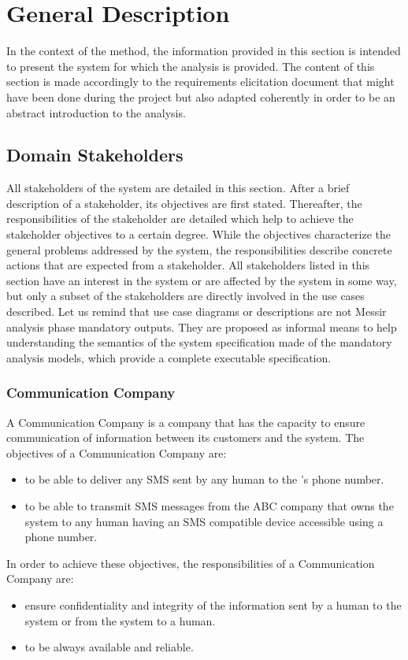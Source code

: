 
\chapter{General Description}
In the context of the \msrmessir method, the information provided in this
section is intended to present the system for which the \msrmessir analysis is
provided. The content of this section is made accordingly to the requirements
elicitation document that might have been done during the project but also
adapted coherently in order to be an abstract introduction to the \msrmessir
analysis.

\section{Domain Stakeholders}
All stakeholders of the system are detailed in this section. After a brief
description of a stakeholder, its objectives are first stated. Thereafter, the
responsibilities of the stakeholder are detailed which help to achieve the
stakeholder objectives to a certain degree. While the objectives characterize
the general problems addressed by the \msrprojectname system, the responsibilities
describe concrete actions that are expected from a stakeholder. All stakeholders
listed in this section have an interest in the system or are affected by the
system in some way, but only a subset of the stakeholders are directly involved
in the use cases described. Let us remind that use case diagrams or descriptions
are not Messir analysis phase mandatory outputs. They are proposed as informal
means to help understanding the semantics of the system specification made of
the mandatory analysis models, which provide a complete executable
specification.

\subsection{Communication Company}
A Communication Company is a company that has the capacity to ensure
communication of information between its customers and the \msrprojectname system. The
objectives of a Communication Company are:
\begin{itemize}
\item to be able to deliver any SMS sent by any human to the \msrprojectname's phone
number.
\item to be able to transmit SMS messages from the ABC company that owns the
\msrprojectname system to any human having an SMS compatible device accessible using a
phone number.
\end{itemize}
In order to achieve these objectives, the responsibilities of a Communication
Company are:
\begin{itemize}
\item ensure confidentiality and integrity of the information sent by a human
to the \msrprojectname system or from the system to a human.
\item to be always available and reliable.
\end{itemize}
